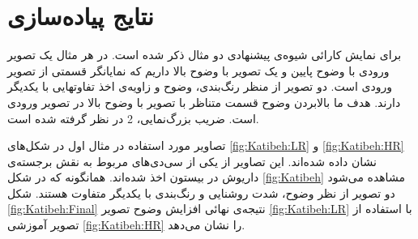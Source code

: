 \documentclass[11pt,a4paper,twocolumn]{article}
\numberwithin{table}{section}
\begin{document}
\section{نتایج پیاده‌سازی}\label{Sec:ExperimentalResults}

برای نمایش کارائی شیوه‌ی پیشنهادی دو مثال ذکر شده است. در هر مثال یک تصویر ورودی با وضوح پایین و یک تصویر با وضوح بالا داریم که نمایانگر قسمتی از تصویر ورودی است. دو تصویر از منظر رنگ‌بندی، وضوح و زاویه‌ی اخذ تفاوتهایی با یکدیگر دارند. هدف ما بالابردن وضوح قسمت متناظر با تصویر با وضوح بالا  در تصویر ورودی است. ضریب بزرگ‌نمایی، 2 در نظر گرفته شده است. 

تصاویر مورد استفاده در مثال اول در شکل‌های \ref{fig:Katibeh:LR} و \ref{fig:Katibeh:HR} نشان داده شده‌اند. این تصاویر از یکی از سی‌دی‌های مربوط به نقش برجسته‌ی داریوش در بیستون اخذ شده‌اند. همانگونه که در شکل \ref{fig:Katibeh} مشاهده می‌شود دو تصویر از نظر وضوح، شدت روشنایی و رنگ‌بندی با یکدیگر متفاوت هستند.  شکل \ref{fig:Katibeh:Final} نتیجه‌ی نهائی افزایش وضوح تصویر \ref{fig:Katibeh:LR} با استفاده از تصویر آموزشی \ref{fig:Katibeh:HR} را نشان می‌دهد. 
\end{document}

